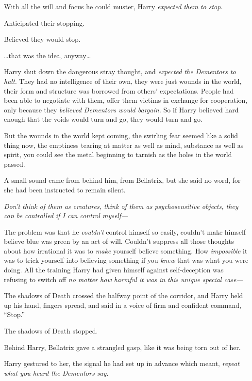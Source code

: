 With all the will and focus he could muster, Harry \emph{expected them
to stop.}

Anticipated their stopping.

Believed they would stop.

\ldots{}that was the idea, anyway\ldots{}

Harry shut down the dangerous stray thought, and \emph{expected the
Dementors to halt.} They had no intelligence of their own, they were
just wounds in the world, their form and structure was borrowed from
others' expectations. People had been able to negotiate with them, offer
them victims in exchange for cooperation, only because they
\emph{believed Dementors would bargain.} So if Harry believed hard
enough that the voids would turn and go, they would turn and go.

But the wounds in the world kept coming, the swirling fear seemed like a
solid thing now, the emptiness tearing at matter as well as mind,
substance as well as spirit, you could see the metal beginning to
tarnish as the holes in the world passed.

A small sound came from behind him, from Bellatrix, but she said no
word, for she had been instructed to remain silent.

\emph{Don't think of them as creatures, think of them as psychosensitive
objects, they can be controlled if I can control myself---}

The problem was that he \emph{couldn't} control himself so easily,
couldn't make himself believe blue was green by an act of will. Couldn't
suppress all those thoughts about how irrational it was to \emph{make}
yourself believe something. How \emph{impossible} it was to trick
yourself into believing something if you \emph{knew} that was what you
were doing. All the training Harry had given himself against
self-deception was refusing to switch off \emph{no matter how harmful it
was in this unique special case---}

The shadows of Death crossed the halfway point of the corridor, and
Harry held up his hand, fingers spread, and said in a voice of firm and
confident command, ``Stop.''

The shadows of Death stopped.

Behind Harry, Bellatrix gave a strangled gasp, like it was being torn
out of her.

Harry gestured to her, the signal he had set up in advance which meant,
\emph{repeat what you heard the Dementors say.}

